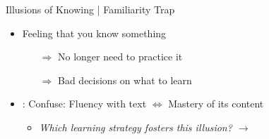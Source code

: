\documentclass{ercisbeamer}
\begin{document}
\begin{frame}{Illusions of Knowing | Familiarity Trap}
    \begin{tbox}
        \begin{itemize}
            \item Feeling that you know something
            \begin{itemize}
                \item[$\Rightarrow$] No longer need to practice it
                \item[$\Rightarrow$] Bad decisions on what to learn
            \end{itemize}
            
            \item {}: Confuse: Fluency with text $\Leftrightarrow$ Mastery of its content
            \begin{itemize}
                \item \emph{Which learning strategy fosters this illusion? \pause $\rightarrow$ }
            \end{itemize}
        \end{itemize}
    \end{tbox}
\end{frame}
\end{document}
